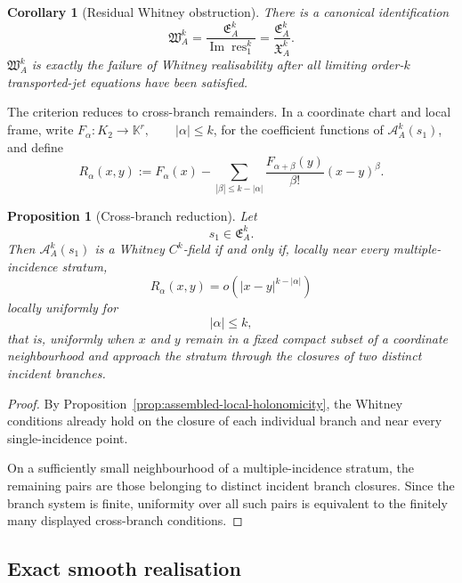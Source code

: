 \documentclass[11pt]{article}
\theoremstyle{plain}
\newtheorem{proposition}[theorem]{Proposition}
\newtheorem{corollary}[theorem]{Corollary}
\theoremstyle{definition}
\begin{document}
\begin{corollary}[Residual Whitney obstruction]
\label{cor:residual-whitney-obstruction}
There is a canonical identification
\[
  \mathfrak W_A^k
  =
  \frac{
    \mathfrak E_A^k
  }{
    \operatorname{Im}\operatorname{res}_1^k
  }
  =
  \frac{
    \mathfrak E_A^k
  }{
    \mathfrak X_A^k
  }.
\]
\(\mathfrak W_A^k\) is exactly the failure of Whitney
realisability after all limiting order-\(k\) transported-jet equations
have been satisfied.
\end{corollary}

The criterion reduces to cross-branch remainders. In a coordinate chart and local frame, write
\(F_\alpha: K_2\longrightarrow\mathbb K^r, \qquad |\alpha|\leq k\),
for the coefficient functions of
\(\mathcal A_A^k(s_1)\), and define
\[
  R_\alpha(x,y)
  :=
  F_\alpha(x)
  -
  \sum_{|\beta|\leq k-|\alpha|}
  \frac{
    F_{\alpha+\beta}(y)
  }{
    \beta!
  }
  (x-y)^\beta.
\]

\begin{proposition}[Cross-branch reduction]
\label{prop:cross-branch-reduction}
Let
\[
  s_1\in\mathfrak E_A^k.
\]
Then \(\mathcal A_A^k(s_1)\) is a Whitney \(C^k\)-field if and only
if, locally near every multiple-incidence stratum,
\[
  R_\alpha(x,y)
  =
  o
  \left(
    |x-y|^{k-|\alpha|}
  \right)
\]
locally uniformly for
\[
  |\alpha|\leq k,
\]
that is, uniformly when \(x\) and \(y\) remain in a fixed compact
subset of a coordinate neighbourhood and approach the stratum through
the closures of two distinct incident branches.
\end{proposition}

\begin{proof}
By
Proposition~\ref{prop:assembled-local-holonomicity},
the Whitney conditions already hold on the closure of each individual
branch and near every single-incidence point.

On a sufficiently small neighbourhood of a multiple-incidence
stratum, the remaining pairs are those belonging to distinct incident
branch closures. Since the branch system is finite, uniformity over
all such pairs is equivalent to the finitely many displayed
cross-branch conditions.
\end{proof}

\subsection{Exact smooth realisation}
\label{subsec:exact-smooth-whitney}
\end{document}
